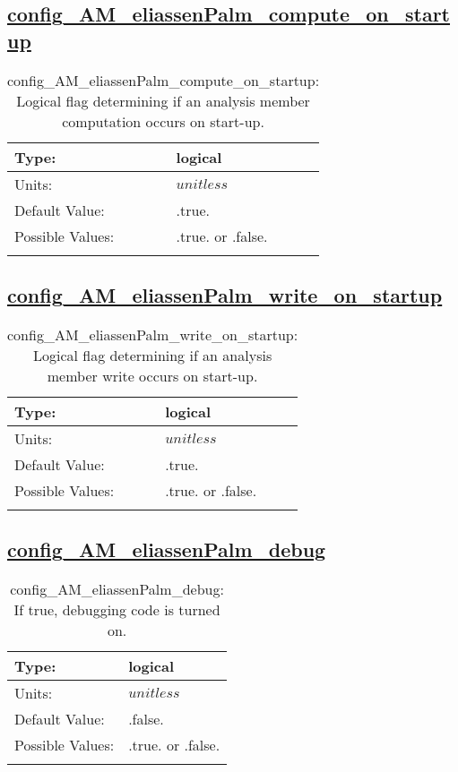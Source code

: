 \subsection[config\_AM\_eliassenPalm\_compute\_on\_startup]{\hyperref[sec:nm_tab_AM_eliassenPalm]{config\_AM\_eliassenPalm\_compute\_on\_startup}}
\label{subsec:nm_sec_config_AM_eliassenPalm_compute_on_startup}
\begin{center}
\begin{longtable}{| p{2.0in} || p{4.0in} |}
    \hline
    Type: & logical \\
    \hline
    Units: & $unitless$ \\
    \hline
    Default Value: & .true. \\
    \hline
    Possible Values: & .true. or .false. \\
    \hline
    \caption{config\_AM\_eliassenPalm\_compute\_on\_startup: Logical flag determining if an analysis member computation occurs on start-up.}
\end{longtable}
\end{center}
\subsection[config\_AM\_eliassenPalm\_write\_on\_startup]{\hyperref[sec:nm_tab_AM_eliassenPalm]{config\_AM\_eliassenPalm\_write\_on\_startup}}
\label{subsec:nm_sec_config_AM_eliassenPalm_write_on_startup}
\begin{center}
\begin{longtable}{| p{2.0in} || p{4.0in} |}
    \hline
    Type: & logical \\
    \hline
    Units: & $unitless$ \\
    \hline
    Default Value: & .true. \\
    \hline
    Possible Values: & .true. or .false. \\
    \hline
    \caption{config\_AM\_eliassenPalm\_write\_on\_startup: Logical flag determining if an analysis member write occurs on start-up.}
\end{longtable}
\end{center}
\subsection[config\_AM\_eliassenPalm\_debug]{\hyperref[sec:nm_tab_AM_eliassenPalm]{config\_AM\_eliassenPalm\_debug}}
\label{subsec:nm_sec_config_AM_eliassenPalm_debug}
\begin{center}
\begin{longtable}{| p{2.0in} || p{4.0in} |}
    \hline
    Type: & logical \\
    \hline
    Units: & $unitless$ \\
    \hline
    Default Value: & .false. \\
    \hline
    Possible Values: & .true. or .false. \\
    \hline
    \caption{config\_AM\_eliassenPalm\_debug: If true, debugging code is turned on.}
\end{longtable}
\end{center}
